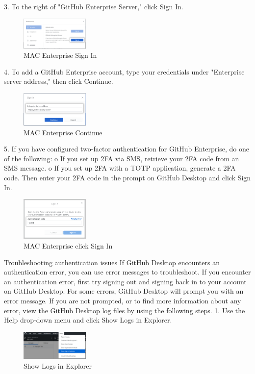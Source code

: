 3.	To the right of "GitHub Enterprise Server," click Sign In.
 \begin{figure}[ht]
    \centering
    \includegraphics[width=0.3\textwidth]{figures/MAC EN Sign In.png}
    \caption{MAC Enterprise Sign In}
\end{figure}

4.	To add a GitHub Enterprise account, type your credentials under "Enterprise server address," then click Continue.

\begin{figure}[ht]
    \centering
    \includegraphics[width=0.3\textwidth]{figures/MAC EN Continue.png}
    \caption{MAC Enterprise Continue}
\end{figure}


5.	If you have configured two-factor authentication for GitHub Enterprise, do one of the following:
o	If you set up 2FA via SMS, retrieve your 2FA code from an SMS message.
o	If you set up 2FA with a TOTP application, generate a 2FA code.
Then enter your 2FA code in the prompt on GitHub Desktop and click Sign In.
 
\begin{figure}[ht]
    \centering
    \includegraphics[width=0.3\textwidth]{figures/MAC EN click Sign In.png}
    \caption{MAC Enterprise click Sign In}
\end{figure}

Troubleshooting authentication issues
If GitHub Desktop encounters an authentication error, you can use error messages to troubleshoot.
If you encounter an authentication error, first try signing out and signing back in to your account on GitHub Desktop.
For some errors, GitHub Desktop will prompt you with an error message. If you are not prompted, or to find more information about any error, view the GitHub Desktop log files by using the following steps.
1.	Use the Help drop-down menu and click Show Logs in Explorer.
\begin{figure}[ht]
    \centering
    \includegraphics[width=0.3\textwidth]{figures/Show Logs in Explorer.png}
    \caption{Show Logs in Explorer}
\end{figure}

